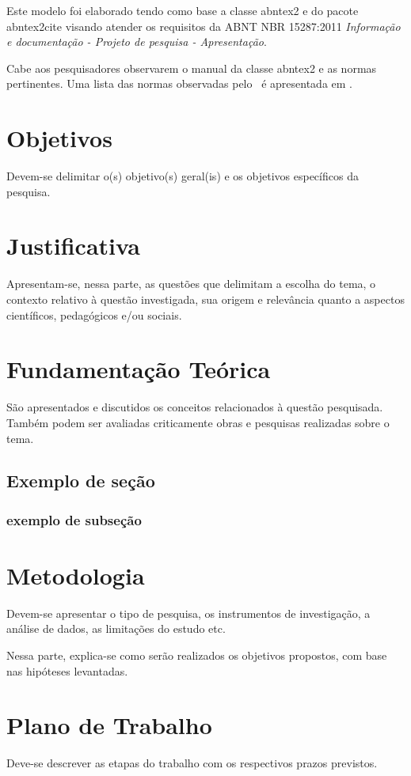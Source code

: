\documentclass[12pt, oneside, a4paper, chapter=TITLE,section=TITLE]{abntex2}
\begin{document}
Este modelo foi elaborado tendo como base a classe \textsf{abntex2} e do pacote \textsf{abntex2cite} visando atender os requisitos da ABNT NBR 15287:2011 \emph{Informação e documentação - Projeto de
pesquisa - Apresentação}.

Cabe aos pesquisadores observarem o manual da classe \textsf{abntex2} e as normas pertinentes. Uma lista das normas observadas pelo \abnTeX\ é apresentada em .

\lipsum[1-5]


\chapter{Objetivos}
Devem-se delimitar o(s) objetivo(s) geral(is) e os objetivos específicos da pesquisa.


\chapter{Justificativa}
Apresentam-se, nessa parte, as questões que delimitam a escolha do tema, o contexto relativo à questão investigada, sua origem e relevância quanto a aspectos científicos, pedagógicos e/ou sociais.

\chapter{Fundamentação Teórica}
São apresentados e discutidos os conceitos relacionados à questão pesquisada. Também podem ser avaliadas criticamente obras e pesquisas realizadas sobre o tema.

\section{Exemplo de seção}
\subsection{exemplo de subseção}


\chapter{Metodologia}
Devem-se apresentar o tipo de pesquisa, os instrumentos de investigação, a análise de dados, as limitações do estudo etc.

Nessa parte, explica-se como serão realizados os objetivos propostos, com base nas hipóteses levantadas. 


\chapter{Plano de Trabalho}
Deve-se descrever as etapas do trabalho com os respectivos prazos previstos.
\end{document}
